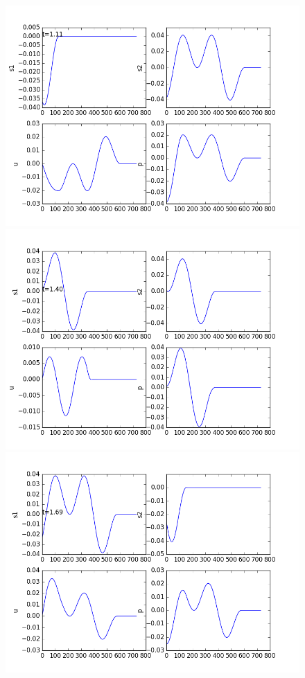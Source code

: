 \documentclass[12pt]{article}
\begin{document}
\begin{enumerate}[(a)]
\begin{figure}[H]
\centering\includegraphics[scale=0.4]{acoustic_eqn_frames/acoustic_eqn_fig20.png}
\centering\includegraphics[scale=0.4]{acoustic_eqn_frames/acoustic_eqn_fig25.png}
\centering\includegraphics[scale=0.4]{acoustic_eqn_frames/acoustic_eqn_fig30.png}

\end{figure}
\end{enumerate}
\end{document}
